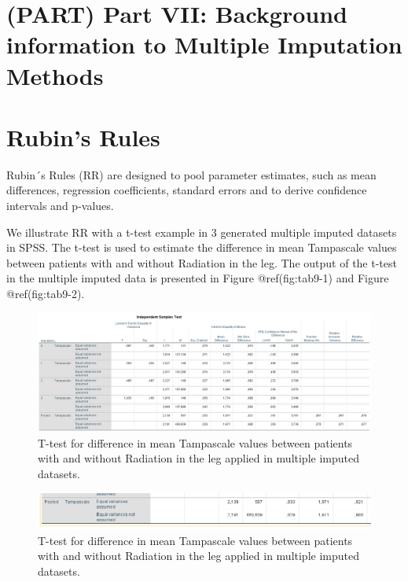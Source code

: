 \documentclass[
]{book}
\begin{document}
\hypertarget{part-part-vii-background-information-to-multiple-imputation-methods}{%
\chapter*{(PART) Part VII: Background information to Multiple Imputation
Methods}\label{part-part-vii-background-information-to-multiple-imputation-methods}}

\hypertarget{rubins-rules}{%
\chapter{Rubin's Rules}\label{rubins-rules}}

Rubin´s Rules (RR) are designed to pool parameter estimates, such as
mean differences, regression coefficients, standard errors and to derive
confidence intervals and p-values.

We illustrate RR with a t-test example in 3 generated multiple imputed
datasets in SPSS. The t-test is used to estimate the difference in mean
Tampascale values between patients with and without Radiation in the
leg. The output of the t-test in the multiple imputed data is presented
in Figure @ref(fig:tab9-1) and Figure @ref(fig:tab9-2).

\begin{figure}

{\centering \includegraphics[width=0.9\linewidth]{images/table5.1} 

}

\caption{T-test for difference in mean Tampascale values between patients with and without Radiation in the leg applied in multiple imputed datasets.}\label{fig:tab9-1}
\end{figure}

\begin{figure}

{\centering \includegraphics[width=0.9\linewidth]{images/table5.1b} 

}

\caption{T-test for difference in mean Tampascale values between patients with and without Radiation in the leg applied in multiple imputed datasets.}\label{fig:tab9-2}
\end{figure}
\end{document}
